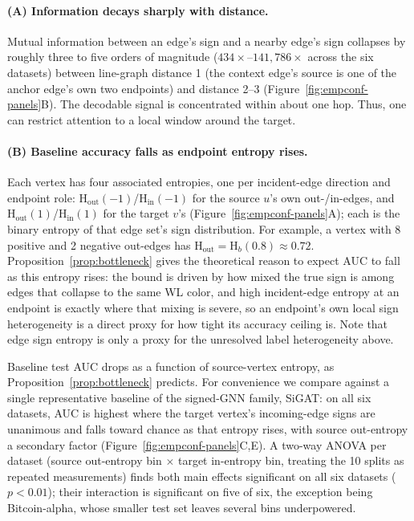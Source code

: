 \documentclass[sigconf, review, anonymous]{acmart}
\newcommand{\Hh}{\mathrm{H}}
\newcommand{\indeg}{\mathrm{in}}
\newcommand{\outdeg}{\mathrm{out}}
\theoremstyle{plain}
\theoremstyle{definition}
\begin{document}
\paragraph{(A) Information decays sharply with distance.}
Mutual information between an edge's sign and a nearby edge's sign collapses by roughly three to five orders of magnitude ($434\times$--$141{,}786\times$ across the six datasets) between line-graph distance 1 (the context edge's source is one of the anchor edge's own two endpoints) and distance 2--3 (Figure~\ref{fig:empconf-panels}B). The decodable signal is concentrated within about one hop. Thus, one can restrict attention to a local window around the target.

\paragraph{(B) Baseline accuracy falls as endpoint entropy rises.}
Each vertex has four associated entropies, one per incident-edge direction and endpoint role: $\Hh_\outdeg(-1)$/$\Hh_\indeg(-1)$ for the source $u$'s own out-/in-edges, and $\Hh_\outdeg(1)$/$\Hh_\indeg(1)$ for the target $v$'s (Figure~\ref{fig:empconf-panels}A); each is the binary entropy of that edge set's sign distribution. For example, a vertex with 8 positive and 2 negative out-edges has $\Hh_\outdeg=\Hh_b(0.8)\approx0.72$. Proposition~\ref{prop:bottleneck} gives the theoretical reason to expect AUC to fall as this entropy rises: the bound is driven by how mixed the true sign is among edges that collapse to the same WL color, and high incident-edge entropy at an endpoint is exactly where that mixing is severe, so an endpoint's own local sign heterogeneity is a direct proxy for how tight its accuracy ceiling is. Note that edge sign entropy is only a proxy for the unresolved label heterogeneity above.

Baseline test AUC drops as a function of source-vertex entropy, as Proposition~\ref{prop:bottleneck} predicts. For convenience we compare against a single representative baseline of the signed-GNN family, SiGAT: on all six datasets, AUC is highest where the target vertex's incoming-edge signs are unanimous and falls toward chance as that entropy rises, with source out-entropy a secondary factor (Figure~\ref{fig:empconf-panels}C,E). A two-way ANOVA per dataset (source out-entropy bin $\times$ target in-entropy bin, treating the 10 splits as repeated measurements) finds both main effects significant on all six datasets ($p<0.01$); their interaction is significant on five of six, the exception being Bitcoin-alpha, whose smaller test set leaves several bins underpowered.
\end{document}
